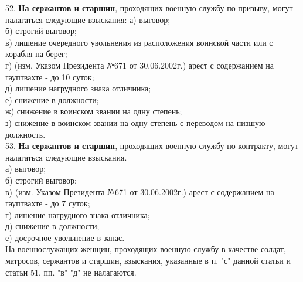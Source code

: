 \documentclass[12pt,a4paper]{report}
\begin{document}
52. \textbf{На сержантов и старшин}, проходящих военную службу по призыву, могут налагаться следующие взыскания:
а) выговор;\\
б) строгий выговор;\\
в) лишение очередного увольнения из расположения воинской части или с корабля на берег;\\
г) (изм. Указом Президента №671 от 30.06.2002г.) арест с содержанием на гауптвахте - до 10 суток;\\
д) лишение нагрудного знака отличника;\\
е) снижение в должности;\\
ж) снижение в воинском звании на одну степень;\\
з) снижение в воинском звании на одну степень с переводом на низшую должность.\\

53. \textbf{На сержантов и старшин}, проходящих военную службу по контракту, могут налагаться следующие взыскания.\\
а) выговор;\\
б) строгий выговор;\\
в) (изм. Указом Президента №671 от 30.06.2002г.) арест с содержанием на гауптвахте - до 7 суток;\\
г) лишение нагрудного знака отличника;\\
д) снижение в должности;\\
е) досрочное увольнение в запас.\\

На военнослужащих-женщин, проходящих военную службу в качестве солдат, матросов, сержантов и старшин, взыскания, указанные в п. "с" данной статьи и статьи 51, пп. "в" "д" не налагаются.
\end{document}
